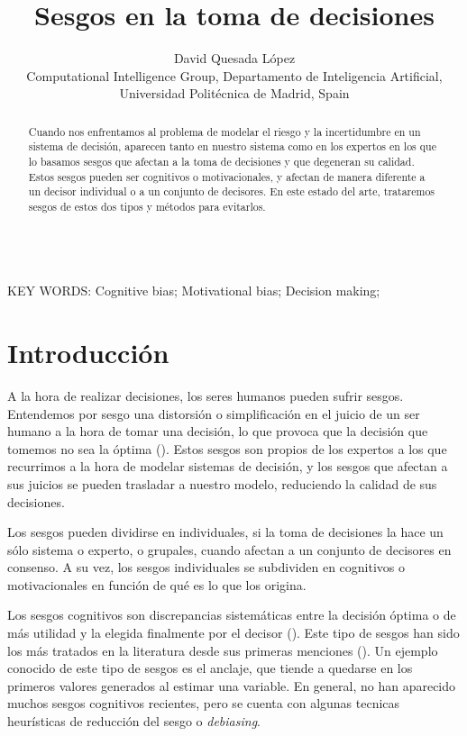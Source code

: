 \documentclass[a4paper,11pt]{article}
\begin{document}
\title{Sesgos en la toma de decisiones}

\author{{David Quesada López}\\
{\small Computational Intelligence Group, Departamento de Inteligencia Artificial, Universidad Polit\'ecnica de Madrid, Spain}}

\date{}
\maketitle



\begin{abstract} 
Cuando nos enfrentamos al problema de modelar el riesgo y la incertidumbre en un sistema de decisión, aparecen tanto en nuestro sistema como en los expertos en los que lo basamos sesgos que afectan a la toma de decisiones y que degeneran su calidad. Estos sesgos pueden ser cognitivos o motivacionales, y afectan de manera diferente a un decisor individual o a un conjunto de decisores. En este estado del arte, trataremos sesgos de estos dos tipos y métodos para evitarlos.
\end{abstract}


\ \\
KEY WORDS: Cognitive bias; Motivational bias; Decision making;




\section{Introducción}

A la hora de realizar decisiones, los seres humanos pueden sufrir sesgos. Entendemos por sesgo una distorsión o simplificación en el juicio de un ser humano a la hora de tomar una decisión, lo que provoca que la decisión que tomemos no sea la óptima (\cite{toet2016}). Estos sesgos son propios de los expertos a los que recurrimos a la hora de modelar sistemas de decisión, y los sesgos que afectan a sus juicios se pueden trasladar a nuestro modelo, reduciendo la calidad de sus decisiones.

Los sesgos pueden dividirse en individuales, si la toma de decisiones la hace un sólo sistema o experto, o grupales, cuando afectan a un conjunto de decisores en consenso. A su vez, los sesgos individuales se subdividen en cognitivos o motivacionales en función de qué es lo que los origina.

Los sesgos cognitivos son discrepancias sistemáticas entre la decisión óptima o de más utilidad y la elegida finalmente por el decisor (\cite{von1986}). Este tipo de sesgos han sido los más tratados en la literatura desde sus primeras menciones (\cite{tversky1974}). Un ejemplo conocido de este tipo de sesgos es el anclaje, que tiende a quedarse en los primeros valores generados al estimar una variable. En general, no han aparecido muchos sesgos cognitivos recientes, pero se cuenta con algunas tecnicas heurísticas de reducción del sesgo o \textit{debiasing}.
\end{document}
